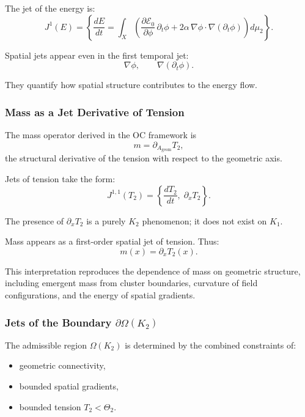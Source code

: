 The jet of the energy is:
\[
J^1(E) =
\left\{
\frac{dE}{dt} =
\int_X
\left(
\frac{\partial\mathcal{E}_0}{\partial\phi}\,\partial_t \phi
+
2\alpha\, \nabla\phi \cdot \nabla(\partial_t \phi)
\right)
d\mu_2
\right\}.
\]

Spatial jets appear even in the first temporal jet:
\[
\nabla \phi,\qquad \nabla(\partial_t \phi).
\]

They quantify how spatial structure contributes to the energy flow.



\subsubsection{Mass as a Jet Derivative of Tension}

The mass operator derived in the OC framework is
\[
m = \partial_{A_{\mathrm{geom}}} T_2,
\]
the structural derivative of the tension with respect to the geometric
axis.

Jets of tension take the form:
\[
J^{1,1}(T_2) =
\left\{
\frac{dT_2}{dt},\;
\partial_x T_2
\right\}.
\]

The presence of $\partial_x T_2$ is a purely $K_2$ phenomenon; it does
not exist on $K_1$.

Mass appears as a first-order spatial jet of tension. Thus:
\[
m(x) = \partial_x T_2(x).
\]

This interpretation reproduces the dependence of mass on geometric
structure, including emergent mass from cluster boundaries, curvature of
field configurations, and the energy of spatial gradients.



\subsubsection{Jets of the Boundary \texorpdfstring{\texorpdfstring{$\partial\Omega(K_2)$}{\partial\Omega(K_2)}}{Boundary}}

The admissible region $\Omega(K_2)$ is determined by the combined
constraints of:

\begin{itemize}
    \item geometric connectivity,
    \item bounded spatial gradients,
    \item bounded tension $T_2<\Theta_2$.
\end{itemize}

